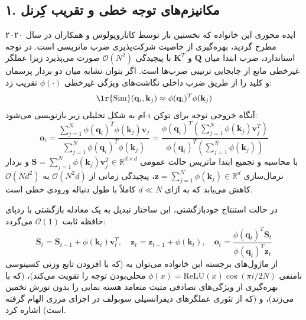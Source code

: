 \documentclass[12pt,a4paper]{report}
\theoremstyle{definition}
\begin{document}
\subsection{۱. مکانیزم‌های توجه خطی و تقریب کِرنل }
ایده محوری این خانواده که نخستین بار توسط کاتاروپولوس و همکاران در سال ۲۰۲۰ مطرح گردید، بهره‌گیری از خاصیت شرکت‌پذیری ضرب ماتریسی است. در توجه استاندارد، ضرب ابتدا میان $\mathbf{Q}$ و $\mathbf{K}^T$ با پیچیدگی $\mathcal{O}(N^2)$ صورت می‌پذیرد زیرا عملگر غیرخطی  مانع از جابجایی ترتیبی ضرب‌ها است. اگر بتوان تشابه میان دو بردار پرسمان و کلید را از طریق ضرب داخلی نگاشت‌های ویژگی غیرخطی $\phi(\cdot)$ تقریب زد:
\begin{equation}
\text{\lr{Sim}}(\mathbf{q}_i, \mathbf{k}_j) \approx \phi(\mathbf{q}_i)^T \phi(\mathbf{k}_j)
\end{equation}
آنگاه خروجی توجه برای توکن $i$-ام به شکل تحلیلی زیر بازنویسی می‌شود:
\begin{equation}
\mathbf{o}_i = \frac{\sum_{j=1}^N \phi(\mathbf{q}_i)^T \phi(\mathbf{k}_j) \mathbf{v}_j}{\sum_{j=1}^N \phi(\mathbf{q}_i)^T \phi(\mathbf{k}_j)} = \frac{\phi(\mathbf{q}_i)^T \left( \sum_{j=1}^N \phi(\mathbf{k}_j) \mathbf{v}_j^T \right)}{\phi(\mathbf{q}_i)^T \left( \sum_{j=1}^N \phi(\mathbf{k}_j) \right)}
\end{equation}
با محاسبه و تجمیع ابتدا ماتریس حالت عمومی $\mathbf{S} = \sum_{j=1}^N \phi(\mathbf{k}_j) \mathbf{v}_j^T \in \mathbb{R}^{d \times d}$ و بردار نرمال‌سازی $\mathbf{z} = \sum_{j=1}^N \phi(\mathbf{k}_j) \in \mathbb{R}^d$، پیچیدگی زمانی از $\mathcal{O}(N^2 d)$ به $\mathcal{O}(N d^2)$ کاهش می‌یابد که به ازای $d \ll N$ کاملاً با طول دنباله ورودی خطی است. 

در حالت استنتاج خودبازگشتی، این ساختار تبدیل به یک معادله بازگشتی با ردپای حافظه ثابت $\mathcal{O}(1)$ می‌گردد:
\begin{equation}
\mathbf{S}_t = \mathbf{S}_{t-1} + \phi(\mathbf{k}_t) \mathbf{v}_t^T, \quad \mathbf{z}_t = \mathbf{z}_{t-1} + \phi(\mathbf{k}_t), \quad \mathbf{o}_t = \frac{\phi(\mathbf{q}_t)^T \mathbf{S}_t}{\phi(\mathbf{q}_t)^T \mathbf{z}_t}
\end{equation}
از ماژول‌های برجسته این خانواده می‌توان به  (که با افزودن تابع وزنی کسینوسی نامنفی $\phi(x) = \text{ReLU}(x) \cos(\pi i / 2N)$ محلی‌بودن توجه را تقویت می‌کند)،  (که با بهره‌گیری از ویژگی‌های تصادفی مثبت متعامد  هسته نمایی را بدون تورش تخمین می‌زند)، و  (که از تئوری عملگرهای دیفرانسیلی سوبولف در اجزای مرزی الهام گرفته است) اشاره کرد.
\end{document}
